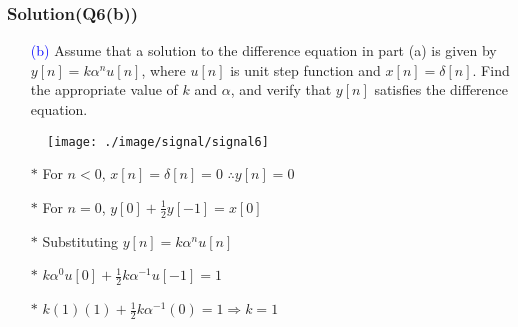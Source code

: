 \documentclass{beamer}
\newcommand{\blue}[1]{\textcolor{blue}{#1}}
\begin{document}
\begin{frame}
\frametitle{Solution(Q6(b))}

\begin{itemize} \itemsep1pt \parskip0pt 
  \item[\blue{(b)}] Assume that a solution to the difference equation in part (a) is given by $y[n] = k\alpha^nu[n]$, where $u[n]$ is unit step function and $x[n] = \delta[n]$. Find the appropriate value of $k$ and $\alpha$, and verify that $y[n]$ satisfies the difference equation.
\end{itemize}


\begin{figure}[H]
  \centering
  \texttt{[image: ./image/signal/signal6]}
\end{figure}

\begin{itemize} \itemsep1pt \parskip0pt 
  \item[$\ast$] For $n < 0$, $x[n]=\delta[n]=0$ $\therefore y[n] = 0$
  \item[$\ast$] For $n = 0$, $y[0] + \frac{1}{2}y[-1] = x[0]$
  \item[$\ast$] Substituting $y[n]=k\alpha^nu[n]$
  \item[$\ast$] $k\alpha^0u[0]+\frac{1}{2}k\alpha^{-1}u[-1]=1$
  \item[$\ast$] $k(1)(1) + \frac{1}{2}k\alpha^{-1}(0) = 1 \Rightarrow k=1$
\end{itemize}


\end{frame}
\end{document}
